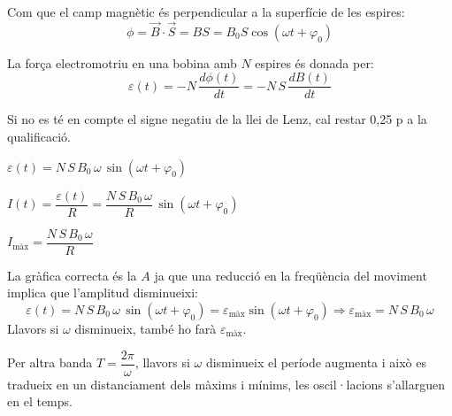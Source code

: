 \begin{solapartat}
 Com que el camp magnètic és perpendicular a la superfície de les espires:
\[ \phi = \vec{B}\cdot\vec{S} = BS = B_0 S\cos(\omega t + \varphi_0) \]

 La força electromotriu en una bobina amb $N$ espires és donada per:
\[ \varepsilon(t) = -N\,\frac{d\phi(t)}{dt} = -N\,S\,\frac{dB(t)}{dt} \]

Si no es té en compte el signe negatiu de la llei de Lenz, cal restar 0,25 p a la
qualificació.

 $\varepsilon(t) = N\,S\,B_0\,\omega\,\sin(\omega t + \varphi_0)$
\end{solapartat}

\begin{solapartat}
 $I(t) = \dfrac{\varepsilon(t)}{R} = \dfrac{N\,S\,B_0\,\omega}{R}\,\sin(\omega t + \varphi_0)$

 $I_{\text{màx}} = \dfrac{N\,S\,B_0\,\omega}{R}$

 La gràfica correcta és la $A$ ja que una reducció en la freqüència del
moviment implica que l'amplitud disminueixi:
\[ \varepsilon(t) = N\,S\,B_0\,\omega\,\sin(\omega t + \varphi_0) = \varepsilon_{\text{màx}}\sin(\omega t + \varphi_0) \Rightarrow \varepsilon_{\text{màx}} = N\,S\,B_0\,\omega \]
Llavors si $\omega$ disminueix, també ho farà $\varepsilon_{\text{màx}}$.

 Per altra banda $T = \dfrac{2\pi}{\omega}$, llavors si $\omega$ disminueix el
període augmenta i això es tradueix en un distanciament dels màxims i mínims, les
oscil·lacions s'allarguen en el temps.
\end{solapartat}
